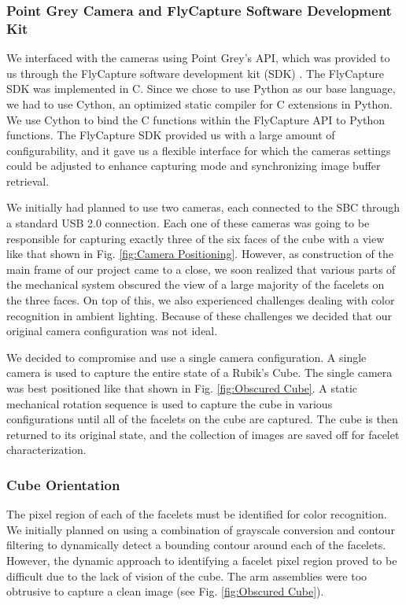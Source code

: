 \documentclass[final, letterpaper, 10 pt, conference, twocolumn]{IEEEtran}
\begin{document}
\subsubsection{Point Grey Camera and FlyCapture Software Development Kit}
We interfaced with the cameras using Point Grey's API, which was provided to us through the FlyCapture software development kit (SDK) \cite{FlyCapture}. The FlyCapture SDK was implemented in C. Since we chose to use Python as our base language, we had to use Cython, an optimized static compiler for C extensions in Python. We use Cython to bind the C functions within the FlyCapture API to Python functions.  The FlyCapture SDK  provided us with a large amount of configurability, and it gave us a flexible interface for which the cameras settings could be adjusted to enhance capturing mode and synchronizing image buffer retrieval.

We initially had planned to use two cameras, each connected to the SBC through a standard USB 2.0 connection. Each one of these cameras was going to be responsible for capturing exactly three of the six faces of the cube with a view like that shown in Fig. \ref{fig:Camera Positioning}. However, as construction of the main frame of our project came to a close, we soon realized that various parts of the mechanical system obscured the view of a large majority of the facelets on the three faces. On top of this, we also experienced challenges dealing with color recognition in ambient lighting. Because of these challenges we decided that our original camera configuration was not ideal.

We decided to compromise and use a single camera configuration. A single camera is used to capture the entire state of a Rubik's Cube. The single camera was best positioned like that shown in Fig. \ref{fig:Obscured Cube}. A static mechanical rotation sequence is used to capture the cube in various configurations until all of the facelets on the cube are captured. The cube is then returned to its original state, and the collection of images are saved off for facelet characterization.

\subsubsection{Cube Orientation} 
The pixel region of each of the facelets  must be identified for color recognition. We initially planned on using a combination of grayscale conversion and contour filtering to dynamically detect a bounding contour around each of the facelets. However, the dynamic approach to identifying a facelet pixel region proved to be difficult due to the lack of vision of the cube. The arm assemblies were too obtrusive to capture a clean image (see Fig. \ref{fig:Obscured Cube}).
\end{document}
